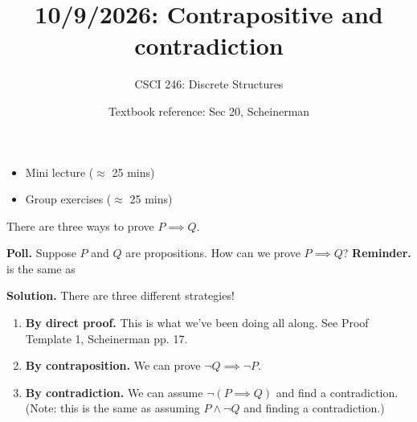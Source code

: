 \documentclass[10pt]{beamer}
\begin{document}






\title{10/9/2026: Contrapositive and contradiction}
\author{CSCI 246: Discrete Structures}
\date{Textbook reference: Sec 20, Scheinerman}

\begin{frame}
    \titlepage 
\end{frame}


\begin{frame}
\begin{myyellowbox}[title=Today's Agenda]
\begin{itemize}	
	\item Mini lecture ($\approx$  25 mins)
	\item Group exercises ($\approx$  25 mins)
\end{itemize}
\end{myyellowbox}
\vfill 
\end{frame}




\begin{frame}{There are three ways to prove $P \implies Q$.}

\colorbox{yellow!30}{\textbf{Poll.}} Suppose $P$ and $Q$ are propositions.  How can we prove $P \implies Q$?
\vfill
\pause 
\colorbox{red!30}{\textbf{Reminder.}}  is the same as 
\vfill 
\pause 

\colorbox{green!30}{\textbf{Solution.}} There are three different strategies!
\begin{enumerate}
	\item \textbf{By direct proof.}   This is what we've been doing all along. See Proof Template 1, Scheinerman pp. 17. \pause 
	\item \textbf{By contraposition.}  We can prove $\lnot Q \implies \lnot P$.   \pause 
	\item \textbf{By contradiction.} We can assume  $\lnot (P \implies Q)$ and find a contradiction.  (Note: this is the same as assuming $P \land \lnot Q$ and finding a contradiction.)
\end{enumerate}	
\end{frame}
\end{document}
